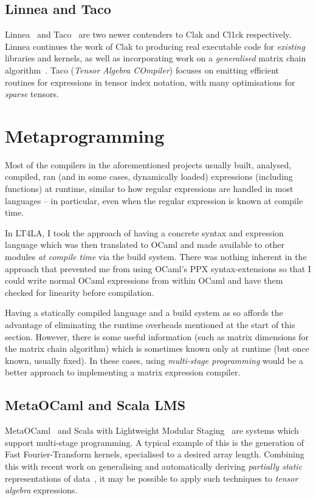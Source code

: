 \subsection{Linnea and Taco}

Linnea~\cite{linnea} and Taco~\cite{taco} are two newer contenders to Clak and
Cl1ck respectively. Linnea continues the work of Clak to producing real
executable code for \emph{existing} libraries and kernels, as well as
incorporating work on a \emph{generalised} matrix chain algorithm~\cite{gmc}.
Taco (\emph{Tensor Algebra COmpiler}) focuses on emitting efficient routines
for expressions in tensor index notation, with many optimisations for
\emph{sparse} tensors.

\section{Metaprogramming}

Most of the compilers in the aforementioned projects usually built, analysed,
compiled, ran (and in some cases, dynamically loaded) expressions (including
functions) at runtime, similar to how regular expressions are handled in most
languages -- in particular, even when the regular expression is known at
compile time.

In LT4LA, I took the approach of having a concrete syntax and expression
language which was then translated to OCaml and made available to other modules
\emph{at compile time} via the build system. There was nothing inherent in the
approach that prevented me from using OCaml's PPX syntax-extensions so that I
could write normal OCaml expressions from within OCaml and have them checked
for linearity before compilation.

Having a statically compiled language and a build system as so affords the
advantage of eliminating the runtime overheads mentioned at the start of this
section. However, there is some useful information (such as matrix dimensions
for the matrix chain algorithm) which is sometimes known only at runtime (but
once known, usually fixed). In these cases, using \emph{multi-stage
programming} would be a better approach to implementing a matrix expression
compiler.

\subsection{MetaOCaml and Scala LMS}

MetaOCaml~\cite{metaocaml} and Scala with Lightweight Modular
Staging~\cite{scala_lms} are systems which support multi-stage programming. A
typical example of this is the generation of Fast Fourier-Transform kernels,
specialised to a desired array length. Combining this with recent work on
generalising and automatically deriving \emph{partially static} representations
of data~\cite{yallop}, it may be possible to apply such techniques to
\emph{tensor algebra} expressions.


